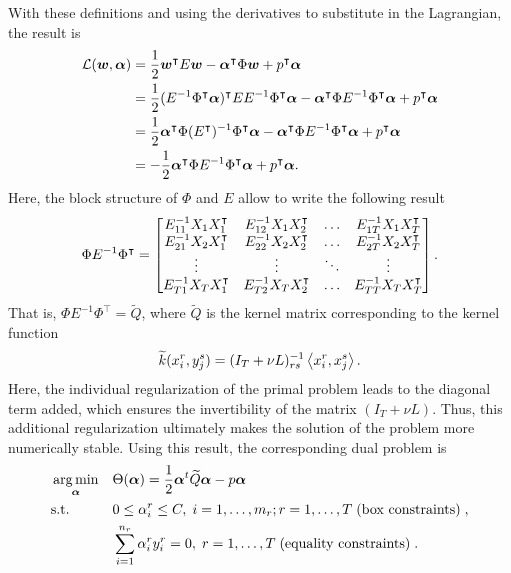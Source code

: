 With these definitions and using the derivatives to substitute in the Lagrangian, the result is
\begin{align*}
    \mathcal{L}(\bm{w}, \bm{\alpha}) &= \frac{1}{2} \bm{w}^\intercal E \bm{w} - \bm{\alpha}^\intercal \Phi \bm{w} + p^\intercal \bm{\alpha} \\
    &= \frac{1}{2} (E^{-1} \Phi^\intercal \bm{\alpha})^\intercal E E^{-1} \Phi^\intercal \bm{\alpha} - \bm{\alpha}^\intercal \Phi E^{-1} \Phi^\intercal \bm{\alpha} + p^\intercal \bm{\alpha} \\
    &= \frac{1}{2} \bm{\alpha}^\intercal \Phi ({E^\intercal})^{-1} \Phi^\intercal \bm{\alpha}  - \bm{\alpha}^\intercal \Phi E^{-1} \Phi^\intercal \bm{\alpha} + p^\intercal \bm{\alpha} \\
    &= -\frac{1}{2}  \bm{\alpha}^\intercal \Phi E^{-1} \Phi^\intercal \bm{\alpha} + p^\intercal \bm{\alpha}.
\end{align*}
Here, the block structure of $\Phi$ and $E$ allow to write the following result 
\begin{equation}
    \label{eq:laplacian_block_linear}
    \Phi E^{-1} \Phi^\intercal = 
    \begin{bmatrix}
        E^{-1}_{11} X_1 X_1^\intercal & E^{-1}_{12} X_1 X_2^\intercal & \ldots & E^{-1}_{1\ntasks} X_1 X_\ntasks^\intercal \\
        E^{-1}_{21} X_2 X_1^\intercal & E^{-1}_{22} X_2 X_2^\intercal & \ldots & E^{-1}_{2\ntasks} X_2 X_\ntasks^\intercal \\
        \vdots & \vdots & \ddots & \vdots \\
        E^{-1}_{\ntasks1} X_\ntasks X_1^\intercal & E^{-1}_{\ntasks 2} X_\ntasks X_2^\intercal & \ldots & E^{-1}_{\ntasks \ntasks} X_\ntasks X_\ntasks^\intercal \\
    \end{bmatrix} .
\end{equation}
That is, $\Phi E^{-1} \Phi^\intercal = \widetilde{Q}$, where $ \widetilde{Q}$ is the kernel matrix corresponding to the kernel function 
\begin{equation}
    \label{eq:kernelfun_gl}
    \widetilde{k}(x_i^r, y_j^s) =  (I_T + \nu L)^{-1}_{rs} \dotp{x_i^r}{x_j^s}.
\end{equation}
Here, the individual regularization of the primal problem leads to the diagonal term added, which ensures the invertibility of the matrix $(I_T + \nu L)$.
Thus, this additional regularization ultimately makes the solution of the problem more numerically stable.
Using this result, the corresponding dual problem is
\begin{equation}\label{eq:linear_gl_dual}
    \begin{aligned}
        & \argmin_{\fv{\alpha}} 
        & & \Theta(\fv{\alpha}) = \frac{1}{2} \fv{\alpha}^t \widetilde{Q} \fv{\alpha} - p \fv{\alpha} \\
        & \text{s.t.}
        & & 0 \leq \alpha_i^r \leq C, \;  i=1,\ldots,m_r; r=1,\ldots,T\; \text{(box constraints)} \; , \\
        & & & \sum_{i=1}^{n_r}{\alpha_i^r y_i^r} = 0, \; r=1,\ldots,T\; \text{(equality constraints)} \; .
        \end{aligned}
\end{equation}


